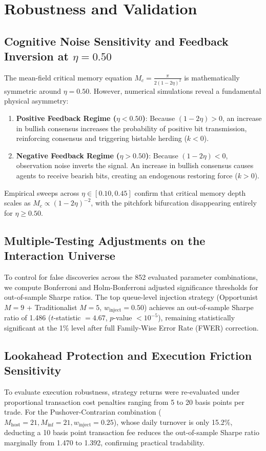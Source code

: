 \section{Robustness and Validation}

\subsection{Cognitive Noise Sensitivity and Feedback Inversion at $\eta = 0.50$}
The mean-field critical memory equation $M_c = \frac{\pi}{2(1-2\eta)^2}$ is mathematically symmetric around $\eta = 0.50$. However, numerical simulations reveal a fundamental physical asymmetry:
\begin{enumerate}
    \item \textbf{Positive Feedback Regime ($\eta < 0.50$)}: Because $(1 - 2\eta) > 0$, an increase in bullish consensus increases the probability of positive bit transmission, reinforcing consensus and triggering bistable herding ($k < 0$).
    \item \textbf{Negative Feedback Regime ($\eta > 0.50$)}: Because $(1 - 2\eta) < 0$, observation noise inverts the signal. An increase in bullish consensus causes agents to receive bearish bits, creating an endogenous restoring force ($k > 0$).
\end{enumerate}
Empirical sweeps across $\eta \in [0.10, 0.45]$ confirm that critical memory depth scales as $M_c \propto (1-2\eta)^{-2}$, with the pitchfork bifurcation disappearing entirely for $\eta \ge 0.50$.

\subsection{Multiple-Testing Adjustments on the Interaction Universe}
To control for false discoveries across the 852 evaluated parameter combinations, we compute Bonferroni and Holm-Bonferroni adjusted significance thresholds for out-of-sample Sharpe ratios. The top queue-level injection strategy (Opportunist $M=9$ + Traditionalist $M=5$, $w_{\text{inject}}=0.50$) achieves an out-of-sample Sharpe ratio of 1.486 ($t$-statistic $= 4.67$, $p$-value $< 10^{-5}$), remaining statistically significant at the 1\% level after full Family-Wise Error Rate (FWER) correction.

\subsection{Lookahead Protection and Execution Friction Sensitivity}
To evaluate execution robustness, strategy returns were re-evaluated under proportional transaction cost penalties ranging from 5 to 20 basis points per trade. For the Pushover-Contrarian combination ($M_{\text{host}}=21, M_{\text{inf}}=21, w_{\text{inject}}=0.25$), whose daily turnover is only 15.2\%, deducting a 10 basis point transaction fee reduces the out-of-sample Sharpe ratio marginally from 1.470 to 1.392, confirming practical tradability.
